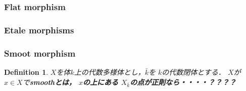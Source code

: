 \documentclass{ujarticle}
\newtheorem{dfn}[thm]{Definition}
\begin{document}
\subsubsection{Flat morphism}
\label{subs:Flat morphism}

\subsubsection{Etale morphisms}
\label{subs:Etale morphisms}

\subsubsection{Smoot morphism}
\label{subs:Smoot morphism}
\begin{dfn}
 $X$を体$k$上の代数多様体とし，$\bar{k} $を $k$の代数閉体とする．
 $X$が$x \in X$で\bf{smooth}とは， $x$の上にある $X_{\bar{k}}$の点が正則なら・・・・？？？？
\end{dfn}
\end{document}

